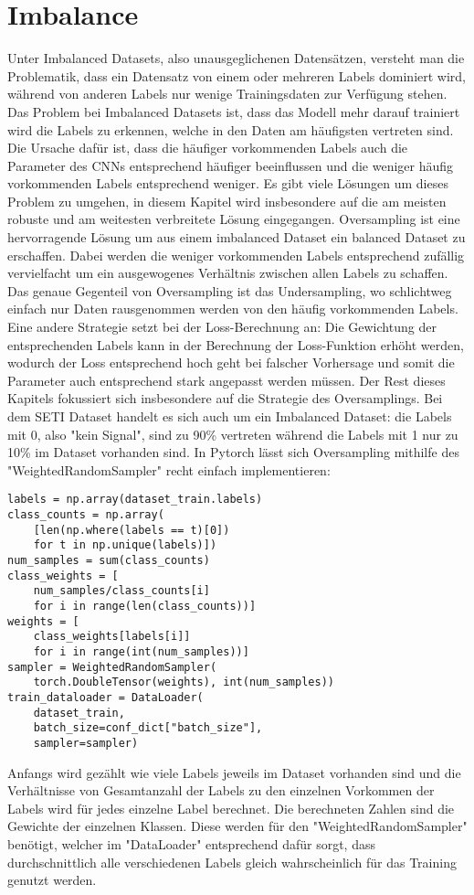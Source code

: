 \documentclass[11pt, a4paper]{article}
\begin{document}
\tableofcontents
\thispagestyle{empty}
\newpage

\section{Imbalance}
Unter Imbalanced Datasets, also unausgeglichenen Datensätzen, versteht man die Problematik, dass ein Datensatz von einem oder mehreren Labels dominiert wird, während von anderen Labels nur wenige Trainingsdaten zur Verfügung stehen. Das Problem bei Imbalanced Datasets ist, dass das Modell mehr darauf trainiert wird die Labels zu erkennen, welche in den Daten am häufigsten vertreten sind. Die Ursache dafür ist, dass die häufiger vorkommenden Labels auch die Parameter des CNNs entsprechend häufiger beeinflussen und die weniger häufig vorkommenden Labels entsprechend weniger. Es gibt viele Lösungen um dieses Problem zu umgehen, in diesem Kapitel wird insbesondere auf die am meisten robuste und am weitesten verbreitete Lösung eingegangen.
\newline
Oversampling ist eine hervorragende Lösung um aus einem imbalanced Dataset ein balanced Dataset zu erschaffen. Dabei werden die weniger vorkommenden Labels entsprechend zufällig vervielfacht um ein ausgewogenes Verhältnis zwischen allen Labels zu schaffen. Das genaue Gegenteil von Oversampling ist das Undersampling, wo schlichtweg einfach nur Daten rausgenommen werden von den häufig vorkommenden Labels. Eine andere Strategie setzt bei der Loss-Berechnung an: Die Gewichtung der entsprechenden Labels kann in der Berechnung der Loss-Funktion erhöht werden, wodurch der Loss entsprechend hoch geht bei falscher Vorhersage und somit die Parameter auch entsprechend stark angepasst werden müssen. Der Rest dieses Kapitels fokussiert sich insbesondere auf die Strategie des Oversamplings.
\newline
Bei dem SETI Dataset handelt es sich auch um ein Imbalanced Dataset: die Labels mit 0, also "kein Signal", sind zu 90\% vertreten während die Labels mit 1 nur zu 10\% im Dataset vorhanden sind. In Pytorch lässt sich Oversampling mithilfe des "WeightedRandomSampler" recht einfach implementieren:
\begin{lstlisting}
labels = np.array(dataset_train.labels)
class_counts = np.array(
	[len(np.where(labels == t)[0]) 
	for t in np.unique(labels)])
num_samples = sum(class_counts)
class_weights = [
	num_samples/class_counts[i] 
	for i in range(len(class_counts))]
weights = [
	class_weights[labels[i]] 
	for i in range(int(num_samples))]
sampler = WeightedRandomSampler(
	torch.DoubleTensor(weights), int(num_samples))
train_dataloader = DataLoader(
	dataset_train, 
	batch_size=conf_dict["batch_size"], 
	sampler=sampler)
\end{lstlisting}
Anfangs wird gezählt wie viele Labels jeweils im Dataset vorhanden sind und die Verhältnisse von Gesamtanzahl der Labels zu den einzelnen Vorkommen der Labels wird für jedes einzelne Label berechnet. Die berechneten Zahlen sind die Gewichte der einzelnen Klassen. Diese werden für den "WeightedRandomSampler" benötigt, welcher im "DataLoader" entsprechend dafür sorgt, dass durchschnittlich alle verschiedenen Labels gleich wahrscheinlich für das Training genutzt werden.
\end{document}
